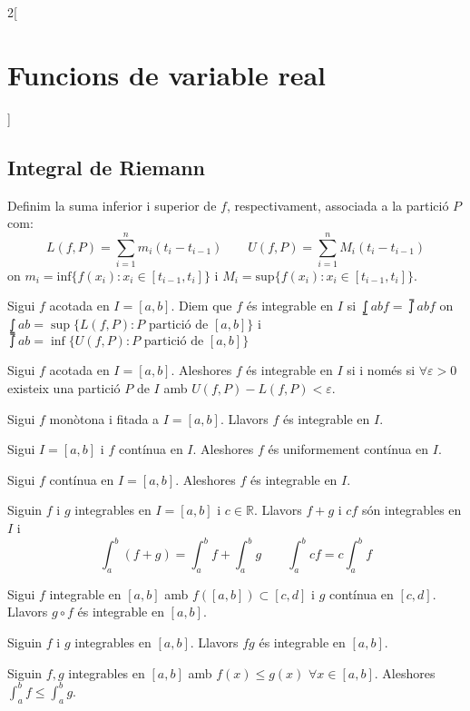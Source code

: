 \documentclass[../../../main.tex]{subfiles}
\begin{document}
\begin{multicols}{2}[\section{Funcions de variable real}]
\subsection{Integral de Riemann}
\begin{definition}
Definim la suma inferior i superior de $f$, respectivament, associada a la partició $P$ com:
$$L(f,P)=\sum_{i=1}^nm_i(t_i-t_{i-1})\qquad U(f,P)=\sum_{i=1}^nM_i(t_i-t_{i-1})$$
on $m_i=\text{inf}\{f(x_i):x_i\in[t_{i-1},t_i]\}$ i $M_i=\text{sup}\{f(x_i):x_i\in[t_{i-1},t_i]\}$.
\end{definition}
\begin{definition}
Sigui $f$ acotada en $I=[a,b]$. Diem que $f$ és integrable en $I$ si $\lowint{a}{b}f=\upint{a}{b}f$ on $\lowint{a}{b}=\sup\{L(f,P):P \text{ partició de }[a,b]\}$ i $\upint{a}{b}=\inf\{U(f,P):P \text{ partició de }[a,b]\}$
\end{definition}
\begin{lemma}
Sigui $f$ acotada en $I=[a,b]$. Aleshores $f$ és integrable en $I$ si i només si $\forall\varepsilon>0$ existeix una partició $P$ de $I$ amb $U(f,P)-L(f,P)<\varepsilon$.
\end{lemma}
\begin{theorem}
Sigui $f$ monòtona i fitada a $I=[a,b]$. Llavors $f$ és integrable en $I$.
\end{theorem}
\begin{theorem}
Sigui $I=[a,b]$ i $f$ contínua en $I$. Aleshores $f$ és uniformement contínua en $I$.
\end{theorem}
\begin{theorem}
Sigui $f$ contínua en $I=[a,b]$. Aleshores $f$ és integrable en $I$.
\end{theorem}
\begin{prop}
Siguin $f$ i $g$ integrables en $I=[a,b]$ i $c\in\mathbb{R}$. Llavors $f+g$ i $cf$  són integrables en $I$ i $$\int_a^b(f+g)=\int_a^bf+\int_a^bg\qquad \int_a^bcf=c\int_a^bf$$
\end{prop}
\begin{theorem}
Sigui $f$ integrable en $[a,b]$ amb $f([a,b])\subset[c,d]$ i $g$ contínua en $[c,d]$. Llavors $g\circ f$ és integrable en $[a,b]$.
\end{theorem}
\begin{corollary}
Siguin $f$ i $g$ integrables en $[a,b]$. Llavors $fg$ és integrable en $[a,b]$.
\end{corollary}
\begin{prop}
Siguin $f,g$ integrables en $[a,b]$ amb $f(x)\leq g(x)$ $\forall x\in [a,b]$. Aleshores $\int_a^bf\leq\int_a^bg$.

\end{prop}
\end{multicols}
\end{document}
